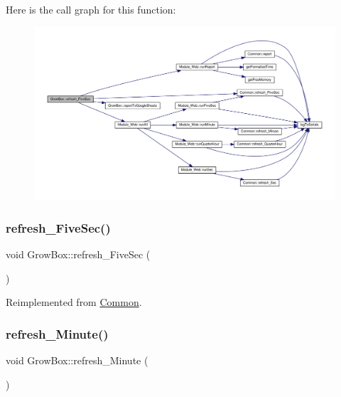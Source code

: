 Here is the call graph for this function\+:
\nopagebreak
\begin{figure}[H]
\begin{center}
\leavevmode
\includegraphics[width=350pt]{class_grow_box_ad3c74a1bbf508489f113215d1f4ae43f_cgraph}
\end{center}
\end{figure}
\mbox{\label{class_grow_box_ad3c74a1bbf508489f113215d1f4ae43f}} 
\subsubsection{\texorpdfstring{refresh\+\_\+\+Five\+Sec()}{refresh\_FiveSec()}\hspace{0.1cm}{\footnotesize\ttfamily [2/2]}}
{\footnotesize\ttfamily void Grow\+Box\+::refresh\+\_\+\+Five\+Sec (\begin{DoxyParamCaption}{ }\end{DoxyParamCaption})\hspace{0.3cm}{\ttfamily [virtual]}}



Reimplemented from \hyperlink{class_common_a604ab36b3a1d9a5bcfcb225149c82f90}{Common}.

\mbox{\label{class_grow_box_a8763d725baee8237bc63865d464375d8}} 
\subsubsection{\texorpdfstring{refresh\+\_\+\+Minute()}{refresh\_Minute()}\hspace{0.1cm}{\footnotesize\ttfamily [1/2]}}
{\footnotesize\ttfamily void Grow\+Box\+::refresh\+\_\+\+Minute (\begin{DoxyParamCaption}{ }\end{DoxyParamCaption})\hspace{0.3cm}{\ttfamily [virtual]}}



